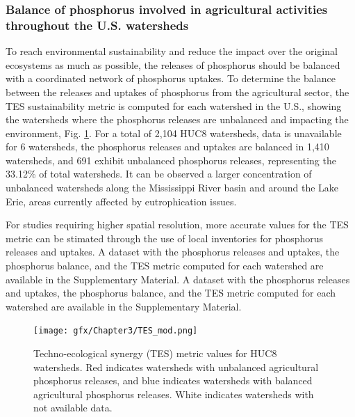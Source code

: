 \begin{refsection}[referencesCh3]
\subsubsection{Balance of phosphorus involved in agricultural activities throughout the U.S. watersheds}
To reach environmental sustainability and reduce the impact over the original ecosystems as much as possible, the releases of phosphorus should be balanced with a coordinated network of phosphorus uptakes. To determine the balance between the releases and uptakes of phosphorus from the agricultural sector, the TES sustainability metric is computed for each watershed in the U.S., showing the watersheds where the phosphorus releases are unbalanced and impacting the environment, Fig. \ref{fig:TES}. For a total of 2,104 HUC8 watersheds, data is unavailable for 6 watersheds, the phosphorus releases and uptakes are balanced in 1,410 watersheds, and 691 exhibit unbalanced phosphorus releases, representing the 33.12\% of total watersheds. It can be observed a larger concentration of unbalanced watersheds along the Mississippi River basin and around the Lake Erie, areas currently affected by eutrophication issues. 

For studies requiring higher spatial resolution, more accurate values for the TES metric can be stimated through the use of local inventories for phosphorus releases and uptakes. A dataset with the phosphorus releases and uptakes, the phosphorus balance, and the TES metric computed for each watershed are available in the Supplementary Material. A dataset with the phosphorus releases and uptakes, the phosphorus balance, and the TES metric computed for each watershed are available in the Supplementary Material.

\begin{figure}[h] 
	\begin{adjustwidth}{}{}
		\centering
		\texttt{[image: gfx/Chapter3/TES\_mod.png]} 
		\caption{Techno-ecological synergy (TES) metric values for HUC8 watersheds. Red indicates watersheds with unbalanced agricultural phosphorus releases, and blue indicates watersheds with balanced agricultural phosphorus releases. White indicates watersheds with not available data.} 
		\label{fig:TES}
	\end{adjustwidth}{}
\end{figure}


\end{refsection}

